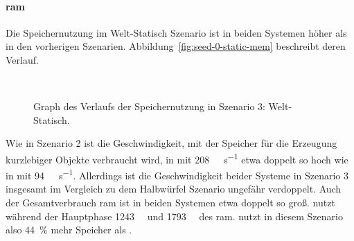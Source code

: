 \paragraph{\ac{ram}}
Die Speichernutzung im Welt-Statisch Szenario ist in beiden Systemen höher als in den vorherigen Szenarien. Abbildung~\vref{fig:seed-0-static-mem} beschreibt deren Verlauf. 
\begin{figure}[!htbp]
	\\
	\caption{Graph des Verlaufs der Speichernutzung in Szenario 3: Welt-Statisch.}\label{fig:seed-0-static-mem}
\end{figure} 
Wie in Szenario 2 ist die Geschwindigkeit, mit der Speicher für die Erzeugung kurzlebiger Objekte verbraucht wird, in \sysB{} mit \SI{208}{\mega\byte\per\second} etwa doppelt so hoch wie in \sysA{} mit \SI{94}{\mega\byte\per\second}. Allerdings ist die Geschwindigkeit beider Systeme in Szenario 3 insgesamt im Vergleich zu dem Halbwürfel Szenario ungefähr verdoppelt.
Auch der Gesamtverbrauch \ac{ram} ist in beiden Systemen etwa doppelt so groß. \sysA{} nutzt während der Hauptphase \SI{1243}{\mega\byte} und \sysB{} \SI{1793}{\mega\byte} des \ac{ram}. \sysB{} nutzt in diesem Szenario also \SI{44}{\percent} mehr Speicher als \sysA{}.   